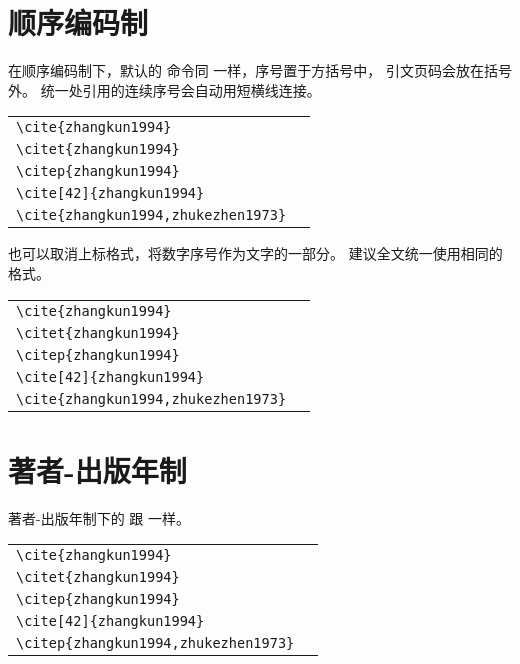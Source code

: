 \section{顺序编码制}

在顺序编码制下，默认的  命令同  一样，序号置于方括号中，
引文页码会放在括号外。
统一处引用的连续序号会自动用短横线连接。

\begin{tabular}{l@{\quad$\Rightarrow$\quad}l}
	\verb|\cite{zhangkun1994}|               & \cite{zhangkun1994}               \\
	\verb|\citet{zhangkun1994}|              & \citet{zhangkun1994}              \\
	\verb|\citep{zhangkun1994}|              & \citep{zhangkun1994}              \\
	\verb|\cite[42]{zhangkun1994}|           & \cite[42]{zhangkun1994}           \\
	\verb|\cite{zhangkun1994,zhukezhen1973}| & \cite{zhangkun1994,zhukezhen1973} \\
\end{tabular}


也可以取消上标格式，将数字序号作为文字的一部分。
建议全文统一使用相同的格式。

\begin{tabular}{l@{\quad$\Rightarrow$\quad}l}
	\verb|\cite{zhangkun1994}|               & \cite{zhangkun1994}               \\
	\verb|\citet{zhangkun1994}|              & \citet{zhangkun1994}              \\
	\verb|\citep{zhangkun1994}|              & \citep{zhangkun1994}              \\
	\verb|\cite[42]{zhangkun1994}|           & \cite[42]{zhangkun1994}           \\
	\verb|\cite{zhangkun1994,zhukezhen1973}| & \cite{zhangkun1994,zhukezhen1973} \\
\end{tabular}



\section{著者-出版年制}

著者-出版年制下的  跟  一样。

\begin{tabular}{l@{\quad$\Rightarrow$\quad}l}
	\verb|\cite{zhangkun1994}|                & \cite{zhangkun1994}                \\
	\verb|\citet{zhangkun1994}|               & \citet{zhangkun1994}               \\
	\verb|\citep{zhangkun1994}|               & \citep{zhangkun1994}               \\
	\verb|\cite[42]{zhangkun1994}|            & \cite[42]{zhangkun1994}            \\
	\verb|\citep{zhangkun1994,zhukezhen1973}| & \citep{zhangkun1994,zhukezhen1973} \\
\end{tabular}

